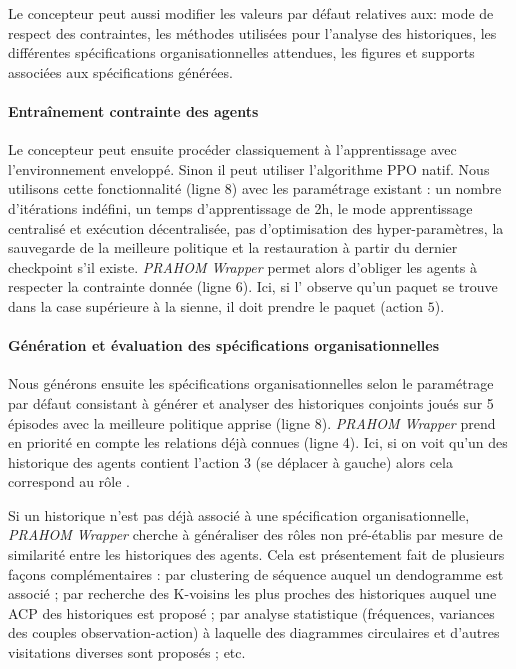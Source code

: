 \documentclass[demonstration]{jfsma}
\newcounter{relation}
\begin{document}
Le concepteur peut aussi modifier les valeurs par défaut relatives aux: mode de respect des contraintes, les méthodes utilisées pour l'analyse des historiques, les différentes spécifications organisationnelles attendues, les figures et supports associées aux spécifications générées.

\paragraph{Entraînement contrainte des agents}

Le concepteur peut ensuite procéder classiquement à l'apprentissage avec l'environnement enveloppé. Sinon il peut utiliser l'algorithme PPO natif. Nous utilisons cette fonctionnalité (ligne 8) avec les paramétrage existant  : un nombre d'itérations indéfini, un temps d'apprentissage de 2h, le mode apprentissage centralisé et exécution décentralisée, pas d'optimisation des hyper-paramètres, la sauvegarde de la meilleure politique et la restauration à partir du dernier checkpoint s'il existe.
\emph{PRAHOM Wrapper} permet alors d'obliger les agents à respecter la contrainte donnée (ligne 6). Ici, si l' observe qu'un paquet se trouve dans la case supérieure à la sienne, il doit prendre le paquet (action $5$).

\paragraph{Génération et évaluation des spécifications organisationnelles }

Nous générons ensuite les spécifications organisationnelles selon le paramétrage par défaut consistant à générer et analyser des historiques conjoints joués sur 5 épisodes avec la meilleure politique apprise (ligne 8).
\emph{PRAHOM Wrapper} prend en priorité en compte les relations déjà connues (ligne 4). Ici, si on voit qu'un des historique des agents contient l'action $3$ (se déplacer à gauche) alors cela correspond au rôle .

Si un historique n'est pas déjà associé à une spécification organisationnelle, \emph{PRAHOM Wrapper} cherche à généraliser des rôles non pré-établis par mesure de similarité entre les historiques des agents. Cela est présentement fait de plusieurs façons complémentaires : par clustering de séquence auquel un dendogramme est associé ; par recherche des K-voisins les plus proches des historiques auquel une ACP des historiques est proposé ; par analyse statistique (fréquences, variances des couples observation-action) à laquelle des diagrammes circulaires et d'autres visitations diverses sont proposés ; etc.
\end{document}
